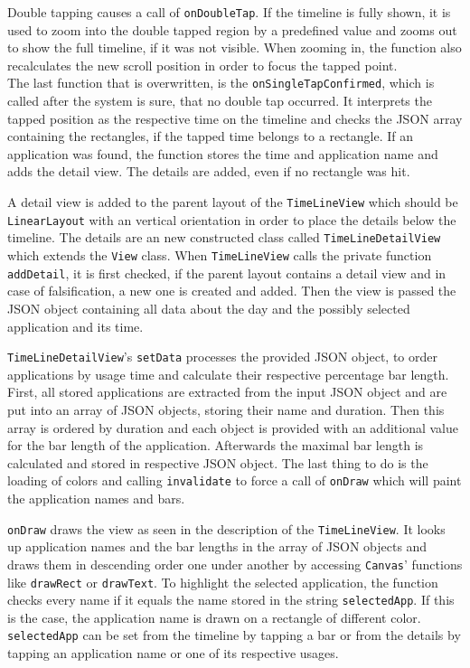 Double  tapping causes a call of \lstinline$onDoubleTap$. If the timeline is fully shown, it is used to zoom into the double tapped region by a predefined value and zooms out to show the full timeline, if it was not visible. When zooming in, the function also recalculates the new scroll position in order to focus the tapped point.\\
The  last function that is overwritten, is the \lstinline$onSingleTapConfirmed$, which is called after the system is sure, that no double tap occurred. It interprets the tapped position as the respective time on the timeline and checks the JSON array containing the rectangles, if the tapped time belongs to a rectangle. If an application was found, the function stores the time and application name and adds the detail view. The details are added, even if no rectangle was hit.

A  detail view is added to the parent layout of the \lstinline$TimeLineView$ which should be \lstinline$LinearLayout$ with an vertical orientation in order to place the details below the timeline. The details are an new constructed class called \lstinline$TimeLineDetailView$ which extends the \lstinline$View$ class. When \lstinline$TimeLineView$ calls the private function \lstinline$addDetail$, it is first checked, if the parent layout contains a detail view and in case of falsification, a new one is created and added. Then the view is passed the JSON object containing all data about the day and the possibly selected application and its time.

\lstinline$TimeLineDetailView$'s  \lstinline$setData$ processes the provided JSON object, to order applications by usage time and calculate their respective percentage bar length. First, all stored applications are extracted from the input JSON object and are put into an array of JSON objects, storing their name and duration. Then this array is ordered by duration and each object is provided with an additional value for the bar length of the application. Afterwards the maximal bar length is calculated and stored in respective JSON object. The last thing to do is the loading of colors and calling \lstinline$invalidate$ to force a call of \lstinline$onDraw$ which will paint the application names and bars.

\lstinline$onDraw$  draws the view as seen in the description of the \lstinline$TimeLineView$. It looks up application names and the bar lengths in the array of JSON objects and draws them in descending order one under another by accessing \lstinline$Canvas$' functions like \lstinline$drawRect$ or \lstinline$drawText$. To highlight the selected application, the function checks every name if it equals the name stored in the string \lstinline$selectedApp$. If this is the case, the application name is drawn on a rectangle of different color. \lstinline$selectedApp$ can be set from the timeline by tapping a bar or from the details by tapping an application name or one of its respective usages.


